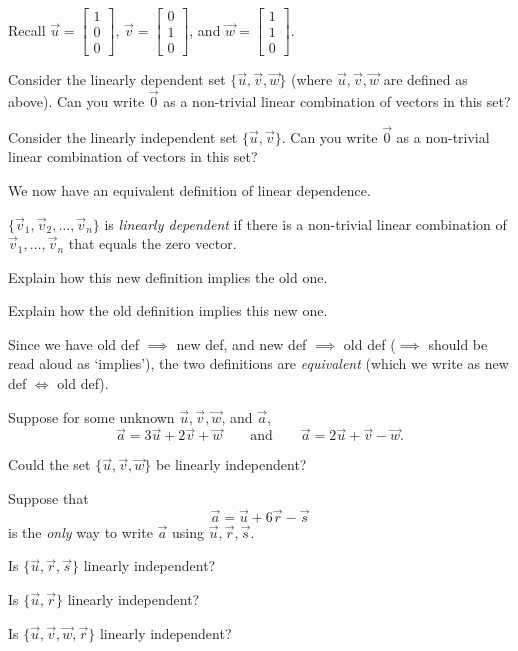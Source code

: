 \documentclass[14pt]{problemset}
\newcommand{\mat}[1]{\begin{bmatrix}#1\end{bmatrix}}
\begin{document}
	\question
		Recall $\vec u=\mat{1\\0\\0}$, $\vec v=\mat{0\\1\\0}$, and $\vec w=\mat{1\\1\\0}$.
	\begin{parts}
		\item Consider the linearly dependent 
		set $\{\vec u,\vec v,\vec w\}$ (where $\vec u,\vec v,\vec w$
		are defined as above).  Can you write $\vec 0$
		as a non-trivial linear combination of vectors in this set?
		\item Consider the linearly independent 
		set $\{\vec u,\vec v\}$.  Can you write $\vec 0$
		as a non-trivial linear combination of vectors in this set?
	\end{parts}

	We now have an equivalent definition of linear dependence.

	\begin{definition}
	$\{\vec v_1,\vec v_2,\ldots,\vec v_n\}$ is
	\emph{linearly dependent} if there is a non-trivial
	linear combination of $\vec v_1,\ldots,\vec v_n$ that
	equals the zero vector.
	\end{definition}

	\question
	\begin{parts}
		\item Explain how this new definition implies the old one.
		\item Explain how the old definition implies this new one.
	\end{parts}

	Since we have old def $\implies$ new def, and new def $\implies$ old def ($\implies$
	should be read aloud as `implies'), the two definitions
	are \emph{equivalent} (which we write as new def $\iff$ old def).


	\question
	Suppose for some unknown $\vec u, \vec v, \vec w$, and $\vec a$,
	\[
		\vec a = 3\vec u+2\vec v +\vec w\qquad \text{and}\qquad 
		\vec a = 2\vec u+\vec v -\vec w.
	\]
	\begin{parts}
		\item Could the set $\{\vec u,\vec v,\vec w\}$ be linearly
		independent?
	\end{parts}
	Suppose that
	\[
		\vec a = \vec u+6\vec r-\vec s
	\]
	is the \emph{only} way to write $\vec a$ using $\vec u,\vec r,\vec s$.
	\begin{parts}[resume]
		\item Is $\{\vec u,\vec r,\vec s\}$ linearly independent?
		\item Is $\{\vec u,\vec r\}$ linearly independent?
		\item Is $\{\vec u,\vec v,\vec w,\vec r\}$ linearly independent?
	\end{parts}
\end{document}
